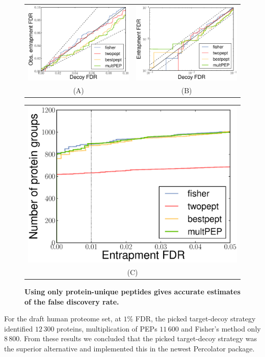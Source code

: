 \documentclass{article}
\begin{document}
\begin{figure}[!htp]
\begin{center}
\begin{tabular}{cc} 
\includegraphics[width=0.45\linewidth]{./img/unique-pept-accuracy} &
\includegraphics[width=0.45\linewidth]{./img/unique-pept-accuracy-log}
\\
(A) & (B)
\end{tabular}
\begin{tabular}{c}
\includegraphics[width=0.45\linewidth]{./img/unique-pept-performance}
\\
(C)
\end{tabular}
\caption{\label{fig:unique-accuracy}\textbf{Using only protein-unique
peptides gives accurate estimates of the false discovery rate.}}
\end{center}
\end{figure}

For the draft human proteome set, at $1\%$ FDR, the picked
target-decoy strategy identified $12\,300$ proteins, multiplication of
PEPs $11\,600$ and Fisher’s method only $8\,800$. From these results
we concluded that the picked target-decoy strategy was the superior
alternative and implemented this in the newest Percolator package.
\end{document}
